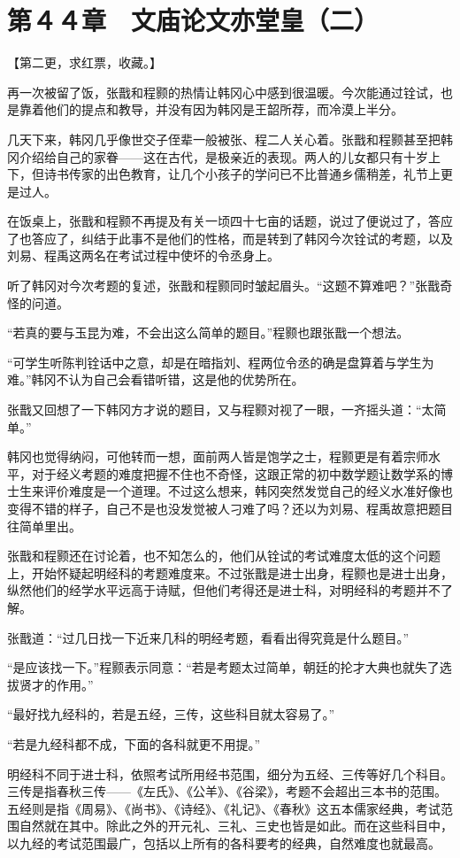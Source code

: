 \section{第４４章　文庙论文亦堂皇（二）}

【第二更，求红票，收藏。】

再一次被留了饭，张戬和程颢的热情让韩冈心中感到很温暖。今次能通过铨试，也是靠着他们的提点和教导，并没有因为韩冈是王韶所荐，而冷漠上半分。

几天下来，韩冈几乎像世交子侄辈一般被张、程二人关心着。张戬和程颢甚至把韩冈介绍给自己的家眷——这在古代，是极亲近的表现。两人的儿女都只有十岁上下，但诗书传家的出色教育，让几个小孩子的学问已不比普通乡儒稍差，礼节上更是过人。

在饭桌上，张戬和程颢不再提及有关一顷四十七亩的话题，说过了便说过了，答应了也答应了，纠结于此事不是他们的性格，而是转到了韩冈今次铨试的考题，以及刘易、程禹这两名在考试过程中使坏的令丞身上。

听了韩冈对今次考题的复述，张戬和程颢同时皱起眉头。“这题不算难吧？”张戬奇怪的问道。

“若真的要与玉昆为难，不会出这么简单的题目。”程颢也跟张戬一个想法。

“可学生听陈判铨话中之意，却是在暗指刘、程两位令丞的确是盘算着与学生为难。”韩冈不认为自己会看错听错，这是他的优势所在。

张戬又回想了一下韩冈方才说的题目，又与程颢对视了一眼，一齐摇头道：“太简单。”

韩冈也觉得纳闷，可他转而一想，面前两人皆是饱学之士，程颢更是有着宗师水平，对于经义考题的难度把握不住也不奇怪，这跟正常的初中数学题让数学系的博士生来评价难度是一个道理。不过这么想来，韩冈突然发觉自己的经义水准好像也变得不错的样子，自己不是也没发觉被人刁难了吗？还以为刘易、程禹故意把题目往简单里出。

张戬和程颢还在讨论着，也不知怎么的，他们从铨试的考试难度太低的这个问题上，开始怀疑起明经科的考题难度来。不过张戬是进士出身，程颢也是进士出身，纵然他们的经学水平远高于诗赋，但他们考得还是进士科，对明经科的考题并不了解。

张戬道：“过几日找一下近来几科的明经考题，看看出得究竟是什么题目。”

“是应该找一下。”程颢表示同意：“若是考题太过简单，朝廷的抡才大典也就失了选拔贤才的作用。”

“最好找九经科的，若是五经，三传，这些科目就太容易了。”

“若是九经科都不成，下面的各科就更不用提。”

明经科不同于进士科，依照考试所用经书范围，细分为五经、三传等好几个科目。三传是指春秋三传——《左氏》、《公羊》、《谷梁》，考题不会超出三本书的范围。五经则是指《周易》、《尚书》、《诗经》、《礼记》、《春秋》这五本儒家经典，考试范围自然就在其中。除此之外的开元礼、三礼、三史也皆是如此。而在这些科目中，以九经的考试范围最广，包括以上所有的各科要考的经典，自然难度也就最高。

